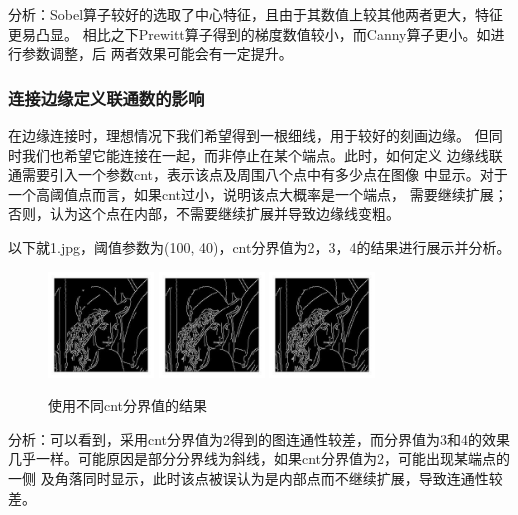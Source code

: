 \documentclass{article}
\begin{document}
    分析：Sobel算子较好的选取了中心特征，且由于其数值上较其他两者更大，特征更易凸显。
    相比之下Prewitt算子得到的梯度数值较小，而Canny算子更小。如进行参数调整，后
    两者效果可能会有一定提升。

\subsubsection{连接边缘定义联通数的影响}

    在边缘连接时，理想情况下我们希望得到一根细线，用于较好的刻画边缘。
    但同时我们也希望它能连接在一起，而非停止在某个端点。此时，如何定义
    边缘线联通需要引入一个参数cnt，表示该点及周围八个点中有多少点在图像
    中显示。对于一个高阈值点而言，如果cnt过小，说明该点大概率是一个端点，
    需要继续扩展；否则，认为这个点在内部，不需要继续扩展并导致边缘线变粗。

    以下就1.jpg，阈值参数为(100, 40)，cnt分界值为2，3，4的结果进行展示并分析。

\begin{figure}[h]
    \centering
    \includegraphics[width=0.25\textwidth]{./contrast/1_cnt=2}
    \includegraphics[width=0.25\textwidth]{./contrast/1_cnt=3}
    \includegraphics[width=0.25\textwidth]{./contrast/1_cnt=4}
    \caption{使用不同cnt分界值的结果}
\end{figure}

    分析：可以看到，采用cnt分界值为2得到的图连通性较差，而分界值为3和4的效果
    几乎一样。可能原因是部分分界线为斜线，如果cnt分界值为2，可能出现某端点的一侧
    及角落同时显示，此时该点被误认为是内部点而不继续扩展，导致连通性较差。
\end{document}
